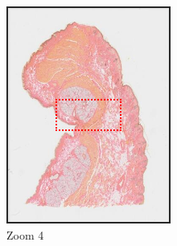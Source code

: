 \documentclass[a4paper,11pt]{report}
\numberwithin{figure}{section} %
\begin{document}
\begin{itemize}
\begin{figure}[H]
            \begin{subfigure}[b]{0.3\textwidth}
            \includegraphics[width=\textwidth]{images/zooms4.png}
            \caption{Zoom 4}
            \end{subfigure}
            \begin{subfigure}[b]{0.3\textwidth}

\end{subfigure}
\end{figure}
\end{itemize}
\end{document}
